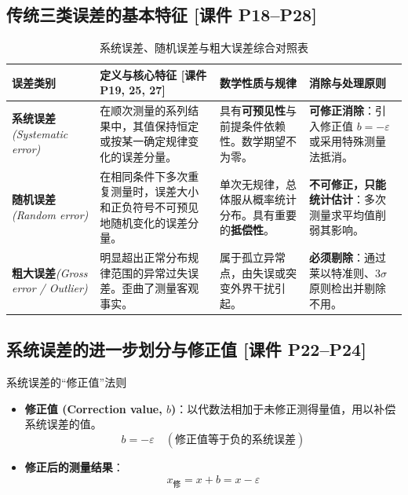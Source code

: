 \documentclass[11pt,a4paper]{ctexart}
\begin{document}
\subsection{传统三类误差的基本特征 \textnormal{[课件 P18--P28]}}

\begin{table}[htbp]
\centering
\small
\renewcommand{\arraystretch}{1.35}
\begin{tabularx}{\textwidth}{p{2.5cm}Xp{4.2cm}p{3.2cm}}
\toprule
\textbf{误差类别} & \textbf{定义与核心特征 [课件 P19, 25, 27]} & \textbf{数学性质与规律} & \textbf{消除与处理原则} \\
\midrule
\textbf{系统误差}\newline\textit{(Systematic error)} & 在顺次测量的系列结果中，其值保持恒定或按某一确定规律变化的误差分量。 & 具有\textbf{可预见性}与前提条件依赖性。数学期望不为零。 & \textbf{可修正消除}：引入修正值 $b = -\varepsilon$ 或采用特殊测量法抵消。 \\
\midrule
\textbf{随机误差}\newline\textit{(Random error)} & 在相同条件下多次重复测量时，误差大小和正负符号不可预见地随机变化的误差分量。 & 单次无规律，总体服从概率统计分布。具有重要的\textbf{抵偿性}。 & \textbf{不可修正，只能统计估计}：多次测量求平均值削弱其影响。 \\
\midrule
\textbf{粗大误差}\newline\textit{(Gross error / Outlier)} & 明显超出正常分布规律范围的异常过失误差。歪曲了测量客观事实。 & 属于孤立异常点，由失误或突变外界干扰引起。 & \textbf{必须剔除}：通过莱以特准则、$3\sigma$ 原则检出并剔除不用。 \\
\bottomrule
\end{tabularx}
\caption{系统误差、随机误差与粗大误差综合对照表}
\end{table}

\subsection{系统误差的进一步划分与修正值 \textnormal{[课件 P22--P24]}}

\begin{defbox}{系统误差的“修正值”法则}
\begin{itemize}
    \item \textbf{修正值 (Correction value, $b$)}：以代数法相加于未修正测得量值，用以补偿系统误差的值。
    \begin{equation}
        b = -\varepsilon \quad (\text{修正值等于负的系统误差})
    \end{equation}
    \item \textbf{修正后的测量结果}：
    \begin{equation}
        x_{\text{修}} = x + b = x - \varepsilon
    \end{equation}
\end{itemize}
\end{defbox}
\end{document}
